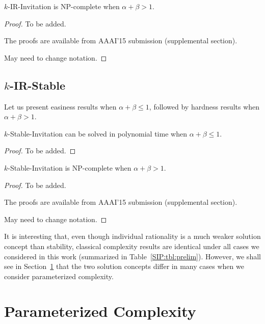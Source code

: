 \begin{theorem} \label{SIP:thm:IR_invitation_NPC}
	$k$-IR-Invitation is NP-complete when $\alpha + \beta > 1$.
\end{theorem} 
\begin{proof} %
	To be added.
	
	The proofs are available from AAAI'15 submission (supplemental section).
	
	May need to change notation.
	

\end{proof}


\subsection{$k$-IR-Stable}

Let us present easiness results when $\alpha + \beta \leq 1$, followed by hardness results when $\alpha + \beta > 1$. 

\begin{theorem} \label{SIP:thm:stable_invitation_P}
	$k$-Stable-Invitation can be solved in polynomial time when $\alpha + \beta \leq 1$.
\end{theorem} 
\begin{proof} %
	To be added.
\end{proof}

\begin{theorem} \label{SIP:thm:stable_invitation_NPC}
	$k$-Stable-Invitation is NP-complete when $\alpha + \beta > 1$.
\end{theorem} 
\begin{proof} %
	To be added.
	
	The proofs are available from AAAI'15 submission (supplemental section).
	
	May need to change notation.


\end{proof}

It is interesting that, even though individual rationality is a much weaker solution concept than stability, classical complexity results are identical under all cases we considered in this work (summarized in Table~\ref{SIP:tbl:prelim}). However, we shall see in Section~\ref{SIP:sec:results} that the two solution concepts differ in many cases when we consider parameterized complexity. 




\section{Parameterized Complexity} \label{SIP:sec:results}

